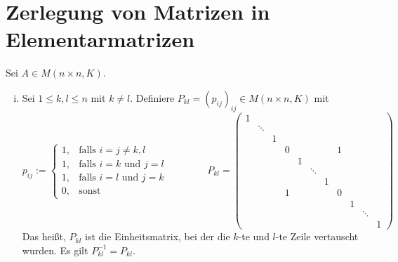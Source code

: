 \section{Zerlegung von Matrizen in Elementarmatrizen}

\begin{definition}[Elementarmatrizen]
	\label{def:I.7.1}
	Sei $A \in M(n \times n,K)$. 
	\begin{enumerate}[(i)]
		\item	Sei $1 \leq k,l \leq n$ mit $k \neq l$.
		Definiere $P_{kl} = (p_{ij})_{ij} \in M(n \times n,K)$ mit
		\[ p_{ij} := \begin{cases}
			1, & \text{falls } i = j \neq k,l \\
			1, & \text{falls } i=k \text{ und } j=l \\
			1, & \text{falls } i=l \text{ und } j=k \\
			0, & \text{sonst}
		\end{cases} \qquad \qquad
		P_{kl} =
			\begin{pmatrix}
				1 &  &  &  &  &  &  &  &  &  &  \\ 
				& \ddots &  &  &  &  &  &  &  &  &  \\ 
				&  & 1 &  &  &  &  &  &  &  &  \\ 
				&  &  & 0 &  &  &  & 1 &  &  &  \\ 
				&  &  &  & 1 &  &  &  &  &  &  \\ 
				&  &  &  &  & \ddots &  &  &  &  &  \\ 
				&  &  &  &  &  & 1 &  &  &  &  \\ 
				&  &  & 1 &  &  &  & 0 &  &  &  \\ 
				&  &  &  &  &  &  &  & 1 &  &  \\ 
				&  &  &  &  &  &  &  &  & \ddots &  \\ 
				&  &  &  &  &  &  &  &  &  & 1
				\end{pmatrix}
		\]
		Das heißt, $P_{kl}$ ist die Einheitsmatrix, bei der die $k$-te und $l$-te Zeile vertauscht wurden.
		Es gilt $P_{kl}^{-1} = P_{kl}$.
		

\end{enumerate}
\end{definition}
